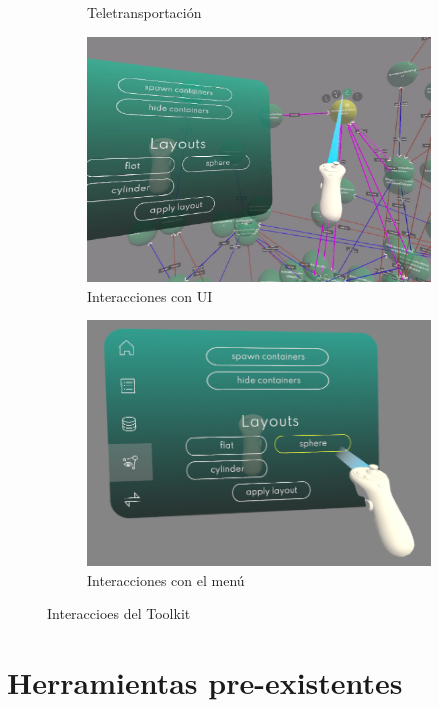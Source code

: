 \begin{figure}[ht]
\begin{subfigure}{0.45\textwidth}
       \caption{Teletransportación}
   \end{subfigure}
   \begin{subfigure}{0.45\textwidth}
       \centering
       \includegraphics[width=\textwidth]{chapter2/figures/highlight.png}
       \caption{Interacciones con UI}
   \end{subfigure}
   \hfill
   \begin{subfigure}{0.45\textwidth}
      \centering
      \includegraphics[width=\textwidth]{chapter2/figures/menu_interaction.png}
      \caption{Interacciones con el menú}
  \end{subfigure}
  \caption{Interaccioes del Toolkit}
\end{figure}

\section{Herramientas pre-existentes}

